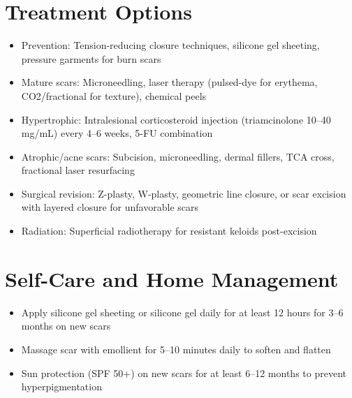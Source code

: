 \section*{Treatment Options}
\begin{itemize}
  \item Prevention: Tension-reducing closure techniques, silicone gel sheeting, pressure garments for burn scars
  \item Mature scars: Microneedling, laser therapy (pulsed-dye for erythema, CO2/fractional for texture), chemical peels
  \item Hypertrophic: Intralesional corticosteroid injection (triamcinolone 10--40 mg/mL) every 4--6 weeks, 5-FU combination
  \item Atrophic/acne scars: Subcision, microneedling, dermal fillers, TCA cross, fractional laser resurfacing
  \item Surgical revision: Z-plasty, W-plasty, geometric line closure, or scar excision with layered closure for unfavorable scars
  \item Radiation: Superficial radiotherapy for resistant keloids post-excision
\end{itemize}

\section*{Self-Care and Home Management}
\begin{itemize}
  \item Apply silicone gel sheeting or silicone gel daily for at least 12 hours for 3--6 months on new scars
  \item Massage scar with emollient for 5--10 minutes daily to soften and flatten
  \item Sun protection (SPF 50+) on new scars for at least 6--12 months to prevent hyperpigmentation
\end{itemize}

